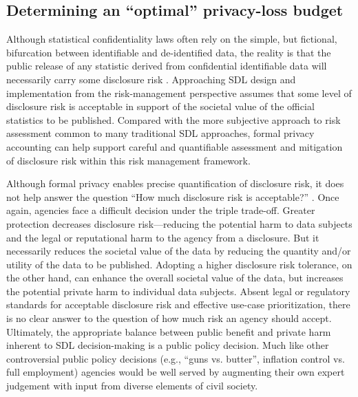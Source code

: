 \subsection{Determining an ``optimal'' privacy-loss budget}
Although statistical confidentiality laws often rely on the simple, but fictional, bifurcation between identifiable and de-identified data, the reality is that the public release of any statistic derived from confidential identifiable data will necessarily carry some disclosure risk \cite{dinur:nissim:2003:10.1145/773153.773173}. Approaching SDL design and implementation from the risk-management perspective assumes that some level of disclosure risk is acceptable in support of the societal value of the official statistics to be published. Compared with the more subjective approach to risk assessment common to many traditional SDL approaches, formal privacy accounting can help support careful and quantifiable assessment and mitigation of disclosure risk within this risk management framework. 

Although formal privacy enables precise quantification of disclosure risk, it does not help answer the question ``How much disclosure risk is acceptable?'' \cite{abowd:schmutte:2019}. Once again, agencies face a difficult decision under the triple trade-off. Greater protection decreases disclosure risk---reducing the potential harm to data subjects and the legal or reputational harm to the agency from a disclosure. But it necessarily reduces the societal value of the data by reducing the quantity and/or utility of the data to be published. Adopting a higher disclosure risk tolerance, on the other hand, can enhance the overall societal value of the data, but increases the potential private harm to individual data subjects. Absent legal or regulatory standards for acceptable disclosure risk and effective use-case prioritization, there is no clear answer to the question of how much risk an agency should accept. Ultimately, the appropriate balance between public benefit and private harm inherent to SDL decision-making is a public policy decision.  Much like other controversial public policy decisions (e.g., ``guns vs. butter'', inflation control vs. full employment) agencies would be well served by augmenting their own expert judgement with input from diverse elements of civil society. 

